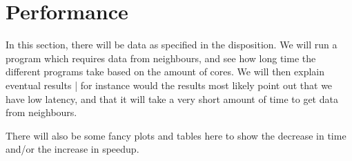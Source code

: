 \section{Performance}


In this section, there will be data as specified in the disposition. We will run
a program which requires data from neighbours, and see how long time the
different programs take based on the amount of cores. We will then explain
eventual results | for instance would the results most likely point out that we
have low latency, and that it will take a very short amount of time to get data
from neighbours.

There will also be some fancy plots and tables here to show the decrease in time
and/or the increase in speedup.
